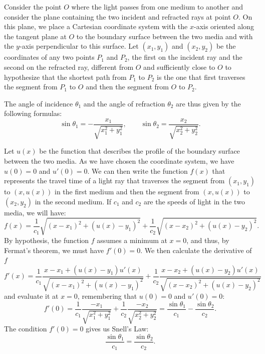 \begin{exercise}
Consider the point $O$ where the light passes from one medium to another
and consider the plane containing the two incident and refracted rays at 
point $O$. On this plane, we place a Cartesian coordinate system 
with the $x$-axis oriented along the tangent plane at $O$ to the boundary 
surface between the two media and with the $y$-axis perpendicular 
to this surface. 
Let $(x_1,y_1)$ and $(x_2,y_2)$ be the coordinates of any two points $P_1$ and
$P_2$,
the first on the incident ray and the second on the refracted ray, different
from $O$
and sufficiently close to $O$ to hypothesize that the shortest path 
from $P_1$ to $P_2$ is the one that first traverses the segment 
from $P_1$ to $O$ and then the segment from $O$ to $P_2$.

The angle of incidence $\theta_1$ and the angle of refraction $\theta_2$
are thus given by the following formulas:
\[
  \sin \theta_1 = -\frac{x_1}{\sqrt{x_1^2+y_1^2}},\qquad
  \sin \theta_2 = \frac{x_2}{\sqrt{x_2^2+y_2^2}}.
\]

Let $u(x)$ be the function that describes the profile of the boundary 
surface between the two media. As we have chosen the coordinate system, we have
$u(0)=0$ and $u'(0)=0$.
We can then write the function $f(x)$ that represents
the travel time of a light ray that traverses 
the segment from $(x_1,y_1)$ to $(x,u(x))$ in the first medium and then 
the segment from $(x,u(x))$ to $(x_2,y_2)$ in the second medium.
If $c_1$ and $c_2$ are the speeds of light in the two media, 
we will have:
\[
  f(x) = \frac{1}{c_1} \sqrt{(x - x_1)^2 + (u(x) - y_1)^2} +
         \frac{1}{c_2} \sqrt{(x - x_2)^2 + (u(x) - y_2)^2}.
\]
By hypothesis, the function $f$ assumes a minimum at $x=0$, 
and thus, by Fermat's theorem, we must have $f'(0)=0$.
We then calculate the derivative of $f$ 
\[
    f'(x) = \frac{1}{c_1}\frac{x - x_1 + (u(x)-y_1)u'(x)}{\sqrt{(x-x_1)^2 +
  (u(x)-y_1)^2}} +
          \frac{1}{c_2}\frac{x - x_2 + (u(x)-y_2)u'(x)}{\sqrt{(x-x_2)^2 + (u(x)-y_2)^2}}
\]
and evaluate it at $x=0$, 
remembering that $u(0)=0$ and $u'(0)=0$:
\[
  f'(0) = \frac{1}{c_1}\frac{- x_1}{\sqrt{x_1^2 + y_1^2}} +
          \frac{1}{c_2}\frac{- x_2}{\sqrt{x_2^2 + y_2^2}}
        = \frac{\sin \theta_1}{c_1} - \frac{\sin \theta_2}{c_2}.
\]
The condition $f'(0)=0$ gives us Snell's Law:
\[
  \frac{\sin \theta_1}{c_1} = \frac{\sin \theta_2}{c_2}.
\]
\end{exercise}

